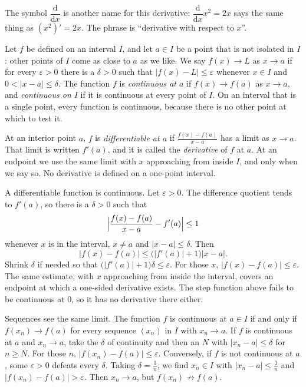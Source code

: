 The symbol $\dfrac{\mathrm d}{\mathrm dx}$ is another name for this derivative: $\dfrac{\mathrm d}{\mathrm dx}x^2=2x$ says the same thing as $(x^2)'=2x$. The phrase is ``derivative with respect to $x$''.

\begin{definitionx}
Let $f$ be defined on an interval $I$, and let $a\in I$ be a point that is not isolated in $I$: other points of $I$ come as close to $a$ as we like. We say $f(x)\to L$ as $x\to a$ if for every $\varepsilon>0$ there is a $\delta>0$ such that $|f(x)-L|\le\varepsilon$ whenever $x\in I$ and $0<|x-a|\le\delta$. The function $f$ is \emph{continuous at $a$} if $f(x)\to f(a)$ as $x\to a$, and \emph{continuous on $I$} if it is continuous at every point of $I$. On an interval that is a single point, every function is continuous, because there is no other point at which to test it.

At an interior point $a$, $f$ is \emph{differentiable at $a$} if $\frac{f(x)-f(a)}{x-a}$ has a limit as $x\to a$. That limit is written $f'(a)$, and it is called the \emph{derivative} of $f$ at $a$. At an endpoint we use the same limit with $x$ approaching from inside $I$, and only when we say so. No derivative is defined on a one-point interval.
\end{definitionx}

A differentiable function is continuous. Let $\varepsilon>0$. The difference quotient tends to $f'(a)$, so there is a $\delta>0$ such that
\[
\Bigl|\frac{f(x)-f(a)}{x-a}-f'(a)\Bigr|\le 1
\]
whenever $x$ is in the interval, $x\ne a$ and $|x-a|\le\delta$. Then
\[
|f(x)-f(a)|\le\bigl(|f'(a)|+1\bigr)|x-a|.
\]
Shrink $\delta$ if needed so that $\bigl(|f'(a)|+1\bigr)\delta\le\varepsilon$. For those $x$, $|f(x)-f(a)|\le\varepsilon$. The same estimate, with $x$ approaching from inside the interval, covers an endpoint at which a one-sided derivative exists. The step function above fails to be continuous at $0$, so it has no derivative there either.

Sequences see the same limit. The function $f$ is continuous at $a\in I$ if and only if $f(x_n)\to f(a)$ for every sequence $(x_n)$ in $I$ with $x_n\to a$. If $f$ is continuous at $a$ and $x_n\to a$, take the $\delta$ of continuity and then an $N$ with $|x_n-a|\le\delta$ for $n\ge N$. For those $n$, $|f(x_n)-f(a)|\le\varepsilon$. Conversely, if $f$ is not continuous at $a$, some $\varepsilon>0$ defeats every $\delta$. Taking $\delta=\frac1n$, we find $x_n\in I$ with $|x_n-a|\le\frac1n$ and $|f(x_n)-f(a)|>\varepsilon$. Then $x_n\to a$, but $f(x_n)\not\to f(a)$.

